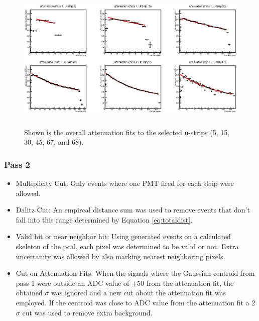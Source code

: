 \begin{figure}[h]
    \centering
    \includegraphics[height= 2.75in, keepaspectratio = true]{atpass1}
    \caption{Shown is the overall attenuation fits to the selected u-strips 
    (5, 15, 30, 45, 67, and 68).}
    \label{fig:atpass1}
\end{figure}



\clearpage
\FloatBarrier
\subsubsection{Pass 2}
\begin{itemize}
    \item Multiplicity Cut: Only events where one PMT fired for each strip were allowed.
    \item Dalitz Cut: An empircal distance sum was used to remove events that don't fall 
    into this range determined by Equation \ref{eq:totaldist}.
    \item Valid hit or near neighbor hit: Using generated events on a calculated skeleton 
    of the pcal, each pixel was determined to be valid or not. Extra uncertainty was allowed 
    by also marking nearest neighboring pixels.
    \item Cut on Attenuation Fits: When the signals where the Gaussian centroid from pass 1 
    were outside an ADC value of $\pm50$ from the attenuation fit, the obtained $\sigma$ was 
    ignored and a new cut about the attenuation fit was employed. If the centroid was close 
    to ADC value from the attenuation fit a 2$\sigma$ cut was used to remove extra background.
\end{itemize}



